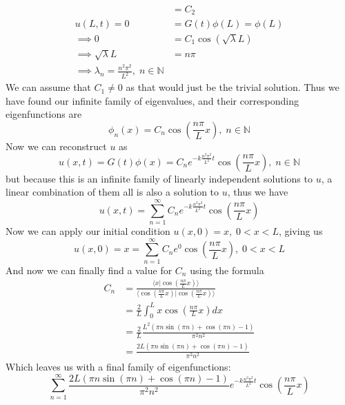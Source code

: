 \documentclass[12pt]{article}
\numberwithin{equation}{section}
\numberwithin{figure}{section}
\begin{document}
\begin{enumerate}
\begin{enumerate}
\begin{align*}
                &=C_2\\
                u(L,t)=0&=G(t)\phi(L)=\phi(L)\\
                \implies 0&=C_1\cos(\sqrt\lambda L)\\
                \implies \sqrt\lambda L&=n\pi \\
                \implies \lambda_n =\frac{n^2\pi^2}{L^2},\; n\in\mathbb{N}
            \end{align*}
            We can assume that $C_1\neq0$ as that would just be the trivial solution. Thus we have found our 
            infinite family of eigenvalues, and their corresponding eigenfunctions are 
            \begin{equation*}
                \phi_n(x)=C_n\cos(\frac{n\pi}{L} x),\; n\in\mathbb{N}
            \end{equation*}
            Now we can reconstruct $u$ as 
            \begin{equation*}
                u(x,t)=G(t)\phi(x)=C_ne^{-k\frac{n^2\pi^2}{L^2} t}\cos(\frac{n\pi}{L} x),\; n\in\mathbb{N}
            \end{equation*}
            but because this is an infinite family of linearly independent solutions to $u$, a linear combination 
            of them all is also a solution to $u$, thus we have 
            \begin{equation*}
                u(x,t)=\sum_{n=1}^\infty C_ne^{-k\frac{n^2\pi^2}{L^2} t}\cos(\frac{n\pi}{L} x)
            \end{equation*}
            Now we can apply our initial condition $u(x,0)=x,\; 0<x<L$, giving us 
            \begin{equation*}
                u(x,0)=x=\sum_{n=1}^\infty C_ne^{0}\cos(\frac{n\pi}{L} x),\; 0<x<L
            \end{equation*}
            And now we can finally find a value for $C_n$ using the formula
            \begin{align*}
                C_n&=\frac{\langle x|\cos(\frac{n\pi}{L} x) \rangle}{\langle \cos(\frac{n\pi}{L} x)|\cos(\frac{n\pi}{L} x) \rangle}\\
                &=\frac{2}{L} \int_0^L x \cos(\frac{n\pi}{L} x) dx\\
                &=\frac{2}{L}\frac{L^2(\pi n\sin(\pi n)+\cos(\pi n)-1)}{\pi^2 n^2}\\
                &=\frac{2L(\pi n\sin(\pi n)+\cos(\pi n)-1)}{\pi^2 n^2}
            \end{align*}
            Which leaves us with a final family of eigenfunctions:
            \begin{equation*}
                \sum_{n=1}^\infty \frac{2L(\pi n\sin(\pi n)+\cos(\pi n)-1)}{\pi^2 n^2}e^{-k\frac{n^2\pi^2}{L^2} t}\cos(\frac{n\pi}{L} x)
            \end{equation*}


\end{enumerate}
\end{enumerate}
\end{document}
